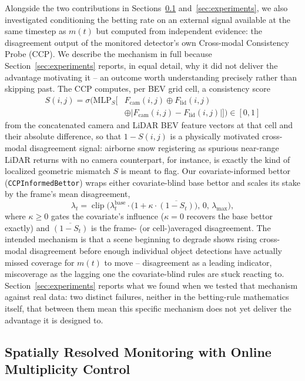 Alongside the two contributions in Sections~\ref{sec:spatial} and~\ref{sec:experiments}, we also investigated conditioning the betting rate on an external signal available at the same timestep as $m(t)$ but computed from independent evidence: the disagreement output of the monitored detector's own Cross-modal Consistency Probe (CCP). We describe the mechanism in full because Section~\ref{sec:experiments} reports, in equal detail, why it did not deliver the advantage motivating it -- an outcome worth understanding precisely rather than skipping past. The CCP computes, per BEV grid cell, a consistency score
\begin{align*}
S(i,j) = \sigma\Big(\mathrm{MLP}_S\big[&F_{\mathrm{cam}}(i,j) \oplus F_{\mathrm{lid}}(i,j) \\
&\oplus |F_{\mathrm{cam}}(i,j) - F_{\mathrm{lid}}(i,j)|\big]\Big) \in [0,1]
\end{align*}
from the concatenated camera and LiDAR BEV feature vectors at that cell and their absolute difference, so that $1 - S(i,j)$ is a physically motivated cross-modal disagreement signal: airborne snow registering as spurious near-range LiDAR returns with no camera counterpart, for instance, is exactly the kind of localized geometric mismatch $S$ is meant to flag. Our covariate-informed bettor (\texttt{CCPInformedBettor}) wraps either covariate-blind base bettor and scales its stake by the frame's mean disagreement,
\[
\lambda_t = \operatorname{clip}\!\Big(\lambda_t^{\text{base}} \cdot \big(1 + \kappa \cdot \overline{(1 - S_t)}\big), \, 0, \, \lambda_{\max}\Big),
\]
where $\kappa \ge 0$ gates the covariate's influence ($\kappa = 0$ recovers the base bettor exactly) and $\overline{(1-S_t)}$ is the frame- (or cell-)averaged disagreement. The intended mechanism is that a scene beginning to degrade shows rising cross-modal disagreement before enough individual object detections have actually missed coverage for $m(t)$ to move -- disagreement as a leading indicator, miscoverage as the lagging one the covariate-blind rules are stuck reacting to. Section~\ref{sec:experiments} reports what we found when we tested that mechanism against real data: two distinct failures, neither in the betting-rule mathematics itself, that between them mean this specific mechanism does not yet deliver the advantage it is designed to.

\subsection{Spatially Resolved Monitoring with Online Multiplicity Control}
\label{sec:spatial}

